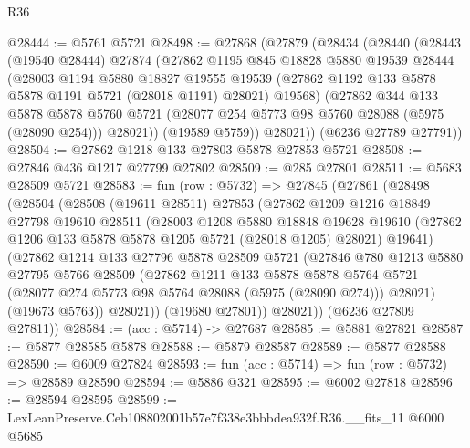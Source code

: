 \begin{lexlean}{R36}
\begin{coremodule}
@28444 := @5761 @5721
@28498 := @27868
    (@27879
      (@28434
        (@28440
          (@28443
            (@19540 @28444)
            @27874
            (@27862
              @1195
              @845
              @18828
              @5880
              @19539
              @28444
              (@28003
                @1194
                @5880
                @18827
                @19555
                @19539
                (@27862 @1192 @133 @5878 @5878 @1191 @5721 (@28018 @1191) @28021)
                @19568)
              (@27862
                @344
                @133
                @5878
                @5878
                @5760
                @5721
                (@28077 @254 @5773 @98 @5760 @28088 (@5975 (@28090 @254)))
                @28021))
            (@19589 @5759))
          @28021))
      (@6236 @27789 @27791))
@28504 := @27862 @1218 @133 @27803 @5878 @27853 @5721
@28508 := @27846 @436 @1217 @27799 @27802
@28509 := @285 @27801
@28511 := @5683 @28509 @5721
@28583 := fun (row : @5732) =>
  @27845
    (@27861
      (@28498
        (@28504
          (@28508
            (@19611 @28511)
            @27853
            (@27862
              @1209
              @1216
              @18849
              @27798
              @19610
              @28511
              (@28003
                @1208
                @5880
                @18848
                @19628
                @19610
                (@27862 @1206 @133 @5878 @5878 @1205 @5721 (@28018 @1205) @28021)
                @19641)
              (@27862
                @1214
                @133
                @27796
                @5878
                @28509
                @5721
                (@27846
                  @780
                  @1213
                  @5880
                  @27795
                  @5766
                  @28509
                  (@27862
                    @1211
                    @133
                    @5878
                    @5878
                    @5764
                    @5721
                    (@28077 @274 @5773 @98 @5764 @28088 (@5975 (@28090 @274)))
                    @28021)
                  (@19673 @5763))
                @28021))
            (@19680 @27801))
          @28021))
      (@6236 @27809 @27811))
@28584 := (acc : @5714) -> @27687
@28585 := @5881 @27821
@28587 := @5877 @28585 @5878
@28588 := @5879 @28587
@28589 := @5877 @28588
@28590 := @6009 @27824
@28593 := fun (acc : @5714) => fun (row : @5732) => @28589 @28590
@28594 := @5886 @321
@28595 := @6002 @27818
@28596 := @28594 @28595
@28599 := LexLeanPreserve.Ceb108802001b57e7f338e3bbbdea932f.R36.__fits_11 @6000 @5685

\end{coremodule}
\end{lexlean}

